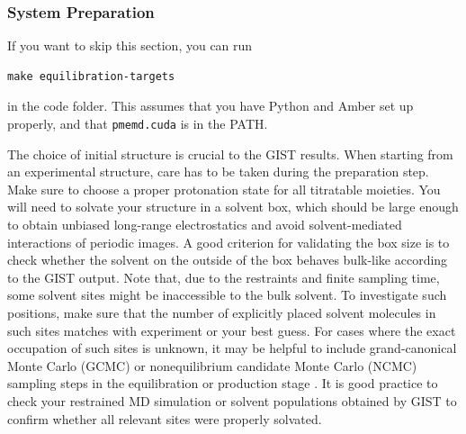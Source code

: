 \documentclass[9pt,tutorial,pubversion]{livecoms}
\newcommand{\software}{\texttt}
\begin{document}
\subsubsection{System Preparation}
If you want to skip this section, you can run 
\begin{lstlisting}[style=bash]
make equilibration-targets
\end{lstlisting}
in the code folder. This assumes that you have Python and Amber set up properly, and that \software{pmemd.cuda} is in the PATH.

The choice of initial structure is crucial to the GIST results.
When starting from an experimental structure, care has to be taken during the preparation step.
Make sure to choose a proper protonation state for all titratable moieties.
You will need to solvate your structure in a solvent box, which should be large enough to obtain unbiased long-range electrostatics and avoid solvent-mediated interactions of periodic images.
A good criterion for validating the box size is to check whether the solvent on the outside of the box behaves bulk-like according to the GIST output.
Note that, due to the restraints and finite sampling time, some solvent sites might be inaccessible to the bulk solvent.
To investigate such positions, make sure that the number of explicitly placed solvent molecules in such sites matches with experiment or your best guess. 
For cases where the exact occupation of such sites is unknown, it may be helpful to include grand-canonical Monte Carlo (GCMC) or nonequilibrium candidate Monte Carlo (NCMC) sampling steps in the equilibration or production stage \cite{Ge-GCMC2022,Melling-NCMC2023}.
It is good practice to check your restrained MD simulation or solvent populations obtained by GIST to confirm whether all relevant sites were properly solvated.
\end{document}

